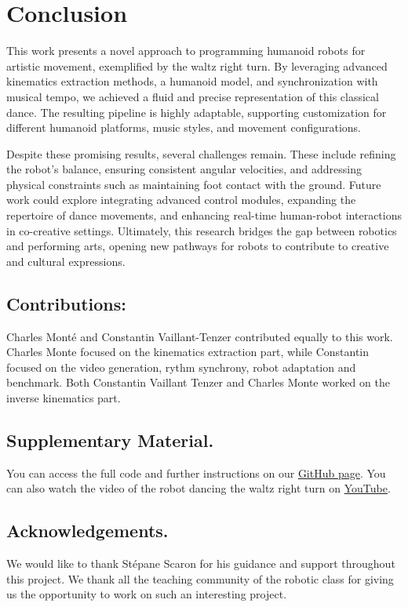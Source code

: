 \documentclass{amsart}
\theoremstyle{definition}
\theoremstyle{plain}
\begin{document}
  \section{Conclusion}

  This work presents a novel approach to programming humanoid robots for artistic movement, exemplified by the waltz right turn. 
  By leveraging advanced kinematics extraction methods, a humanoid model, 
  and synchronization with musical tempo, we achieved a fluid and precise representation of this classical dance. 
  The resulting pipeline is highly adaptable, supporting customization for different humanoid platforms, music styles, and movement configurations.

  Despite these promising results, several challenges remain. 
  These include refining the robot's balance, ensuring consistent angular velocities, and addressing physical constraints such as maintaining foot contact with the ground. 
  Future work could explore integrating advanced control modules, expanding the repertoire of dance movements, and enhancing real-time human-robot interactions in co-creative settings. 
  Ultimately, this research bridges the gap between robotics and performing arts, opening new pathways for robots to contribute to creative and cultural expressions.
  

\subsection*{Contributions:} Charles Monté and Constantin Vaillant-Tenzer contributed equally to this work. Charles Monte focused on the kinematics extraction part, while Constantin focused on the video generation, rythm synchrony, robot adaptation and benchmark. 
Both Constantin Vaillant Tenzer and Charles Monte worked on the inverse kinematics part.

\subsection*{Supplementary Material.} You can access the full code and further instructions on our \href{https://github.com/cvt8/waltz_robot}{GitHub page}.
You can also watch the video of the robot dancing the waltz right turn on \href{https://www.youtube.com/watch?v=1MIFP3BURI0}{YouTube}.

\subsection*{Acknowledgements.} We would like to thank Stépane Scaron for his guidance and support throughout this project. 
We thank all the teaching community of the robotic class for giving us the opportunity to work on such an interesting project.

\printbibliography[]
\end{document}
